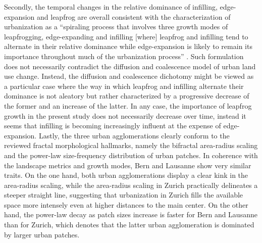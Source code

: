 \documentclass[10pt,letterpaper]{article}
\begin{document}
Secondly, the temporal changes in the relative dominance of infilling, edge-expansion and leapfrog are overall consistent with the characterization of urbanization as a ``spiraling process that involves three growth modes of leapfrogging, edge-expanding and infilling [where] leapfrog and infilling tend to alternate in their relative dominance while edge-expansion is likely to remain its importance throughout much of the urbanization process'' \cite{li2013quantifying}. %
Such formulation does not necessarily contradict the diffusion and coalescence model of urban land use change.
Instead, the diffusion and coalescence dichotomy might be viewed as a particular case where the way in which leapfrog and infilling alternate their dominance is not aleatory but rather characterized by a progressive decrease of the former and an increase of the latter.
In any case, the importance of leapfrog growth in the present study does not necessarily decrease over time, instead it seems that infilling is becoming increasingly influent at the expense of edge-expansion.
Lastly, the three urban agglomerations clearly conform to the reviewed fractal morphological hallmarks, namely the bifractal area-radius scaling and the power-law size-frequency distribution of urban patches.
In coherence with the landscape metrics and growth modes, Bern and Lausanne show very similar traits. On the one hand, both urban agglomerations display a clear kink in the area-radius scaling, while the area-radius scaling in Zurich practically delineates a steeper straight line, suggesting that urbanization in Zurich fills the available space more intensely even at higher distances to the main center. On the other hand, the power-law decay as patch sizes increase is faster for Bern and Lausanne than for Zurich, which denotes that the latter urban agglomeration is dominated by larger urban patches.
\end{document}
